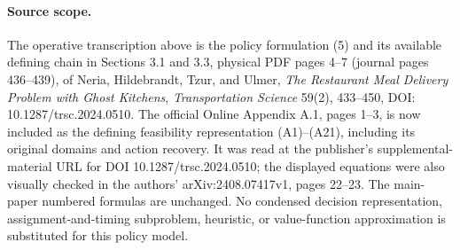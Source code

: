 \documentclass{article}
\begin{document}
\paragraph{Source scope.}
The operative transcription above is the policy formulation (5) and its available defining chain in Sections 3.1 and 3.3, physical PDF pages 4--7 (journal pages 436--439), of Neria, Hildebrandt, Tzur, and Ulmer, \emph{The Restaurant Meal Delivery Problem with Ghost Kitchens}, \emph{Transportation Science} 59(2), 433--450, DOI: 10.1287/trsc.2024.0510. The official Online Appendix A.1, pages 1--3, is now included as the defining feasibility representation (A1)--(A21), including its original domains and action recovery. It was read at the publisher's supplemental-material URL for DOI 10.1287/trsc.2024.0510; the displayed equations were also visually checked in the authors' arXiv:2408.07417v1, pages 22--23. The main-paper numbered formulas are unchanged. No condensed decision representation, assignment-and-timing subproblem, heuristic, or value-function approximation is substituted for this policy model.
\end{document}

